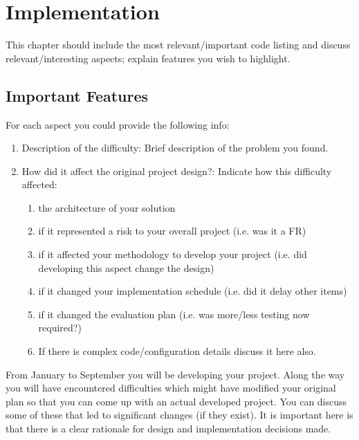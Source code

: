 \chapter{Implementation}
\label{chap:imp}
This chapter should include the most relevant/important code listing and discuss relevant/interesting aspects; explain features you wish to highlight. 

\section{Important Features}
For each aspect you could provide the following info:
\begin{enumerate}
    \item Description of the difficulty: Brief description of the problem you found.
    \item How did it affect the original project design?: Indicate how this difficulty affected:
    \begin{enumerate}
        \item the architecture of your solution
        \item if it represented a risk to your overall project (i.e. was it a FR)
        \item if it affected your methodology to develop your project (i.e. did developing this aspect change the design)
        \item if it changed your implementation schedule (i.e. did it delay other items)
        \item if it changed the evaluation plan (i.e. was more/less testing now required?)
    \item If there is complex code/configuration details discuss it here also.
    \end{enumerate}
\end{enumerate}

From January to September you will be developing your project. Along the way you will have encountered difficulties which might have modified your original plan so that you can come up with an actual developed project. You can discuss some of these that led to significant changes (if they exist). It is important here is that there is a clear rationale for design and implementation decisions made.